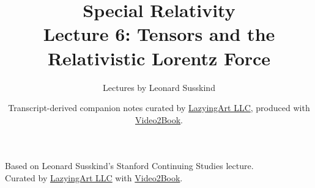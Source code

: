 \documentclass[11pt,oneside]{book}
\begin{document}
\frontmatter
\title{Special Relativity\\Lecture 6: Tensors and the Relativistic Lorentz Force}
\author{Lectures by Leonard Susskind}
\date{Transcript-derived companion notes curated by \href{https://lazying.art}{LazyingArt LLC}, produced with \href{https://github.com/lachlanchen/Video2Book}{Video2Book}.}
\maketitle
\setcounter{page}{2}
\begin{center}
\small Based on Leonard Susskind's Stanford Continuing Studies lecture.\\
Curated by \href{https://lazying.art}{LazyingArt LLC} with \href{https://github.com/lachlanchen/Video2Book}{Video2Book}.
\end{center}
\clearpage
\mainmatter

\end{document}
